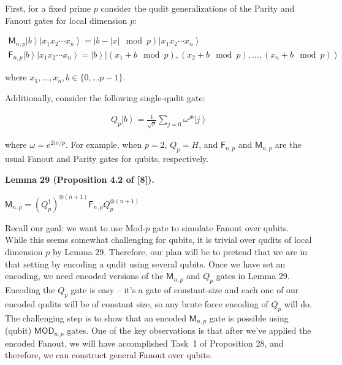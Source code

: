 First, for a fixed prime $p$ consider the qudit generalizations of the Parity and Fanout gates for local dimension $p$:\par


\[\begin{gathered}
\displaystyle\mathsf{M}_{n,p}\left|b\right\rangle\left|x_{1}x_{2}\cdots x_{n}\right\rangle \displaystyle=\left|b-|x|\mod{p}\right\rangle\left|x_{1}x_{2}\cdots x_{n}\right\rangle \\
\displaystyle\mathsf{F}_{n,p}\left|b\right\rangle\left|x_{1}x_{2}\cdots x_{n}\right\rangle \displaystyle=\left|b\right\rangle\left|(x_{1}+b\mod{p}),(x_{2}+b\mod{p}),\ldots,(x_{n}+b\mod{p})\right\rangle
\end{gathered}\]


where $x_{1},\ldots,x_{n},b\in\{0,\dots p-1\}$.\par




Additionally, consider the following single-qudit gate:\par


\[\begin{gathered}
\displaystyle Q_{p}\left|b\right\rangle=\frac{1}{\sqrt{p}}\sum_{j=0}\omega^{jb}\left|j\right\rangle
\end{gathered}\]


where $\omega=e^{2i\pi/p}$. For example, when $p=2$, $Q_{p}=H$, and $\mathsf{F}_{n,p}$ and $\mathsf{M}_{n,p}$ are the usual Fanout and Parity gates for qubits, respectively.\par





\par\medskip\noindent\textbf{
\textbf{Lemma 29}\textbf{ }(Proposition 4.2 of [8])\textbf{.}
}\par



$\mathsf{M}_{n,p}=(Q_{p}^{{\dagger}})^{\otimes(n+1)}\mathsf{F}_{n,p}Q_{p}^{\otimes(n+1)}$\emph{}\par






Recall our goal: we want to use Mod-$p$ gate to simulate Fanout over qubits. While this seems somewhat challenging for qubits, it is trivial over qudits of local dimension $p$ by Lemma 29. Therefore, our plan will be to pretend that we are in that setting by encoding a qudit using several qubits. Once we have set an encoding, we need encoded versions of the $\mathsf{M}_{n,p}$ and $Q_{p}$ gates in Lemma 29. Encoding the $Q_{p}$ gate is easy – it’s a gate of constant-size and each one of our encoded qudits will be of constant size, so any brute force encoding of $Q_{p}$ will do. The challenging step is to show that an encoded $\mathsf{M}_{n,p}$ gate is possible using (qubit) $\mathsf{MOD}_{n,p}$ gates. One of the key observations is that after we’ve applied the encoded Fanout, we will have accomplished Task 1 of Proposition 28, and therefore, we can construct general Fanout over qubits.\par




